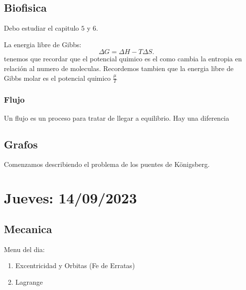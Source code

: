 \documentclass{report}
\begin{document}
      \section{Biofisica}

      Debo estudiar el capitulo $5$ y $6$.

      La energia libre de Gibbs: \[
      \Delta G = \Delta H - T \Delta S
      .\] tenemos que recordar que el potencial quimico es el como cambia la entropia en relación al numero de moleculas. Recordemos tambien que la energia libre de Gibbs molar es el potencial quimico $\frac{\mu}{T}$

      \subsection{Flujo}

      Un flujo es un proceso para tratar de llegar a equilibrio. Hay una diferencia

      \section{Grafos}

      Comenzamos describiendo el problema de los puentes de K\"{o}nigsberg.




      \chapter{Jueves: 14/09/2023}

      \section{Mecanica}
      Menu del dia:
      \begin{enumerate}
        \item Excentricidad y Orbitas (Fe de Erratas)
	\item Lagrange
      \end{enumerate}
\end{document}
